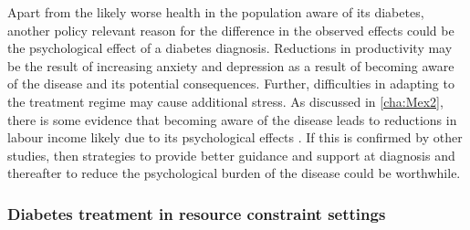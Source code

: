 Apart from the likely worse health in the population aware of its diabetes, another policy relevant reason for the difference in the observed effects could be the psychological effect of a diabetes diagnosis. Reductions in productivity may be the result of increasing anxiety and depression as a result of becoming aware of the disease and its potential consequences. Further, difficulties in adapting to the treatment regime may cause additional stress. As discussed in \ref{cha:Mex2}, there is some evidence that becoming aware of the disease leads to reductions in labour income likely due to its psychological effects \parencite{Liu2014}. If this is confirmed by other studies, then strategies to provide better guidance and support at diagnosis and thereafter to reduce the psychological burden of the disease could be worthwhile.



\subsubsection{Diabetes treatment in resource constraint settings}

